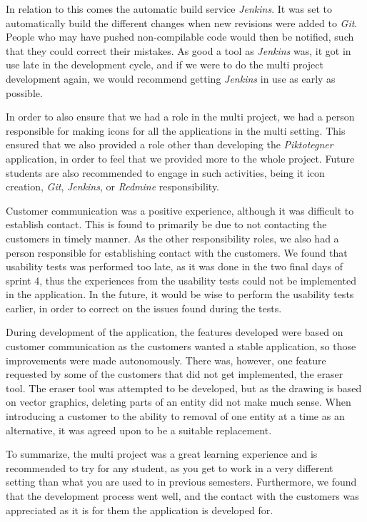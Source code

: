 In relation to this comes the automatic build service \textit{Jenkins}. 
It was set to automatically build the different changes when new revisions were added to \textit{Git}. 
People who may have pushed non-compilable code would then be notified, such that they could correct their mistakes.
As good a tool as \textit{Jenkins} was, it got in use late in the development cycle, and if we were to do the multi project development again, we would recommend getting \textit{Jenkins} in use as early as possible.

In order to also ensure that we had a role in the multi project, we had a person responsible for making icons for all the applications in the multi setting.
This ensured that we also provided a role other than developing the \textit{Piktotegner} application, in order to feel that we provided more to the whole project. 
Future students are also recommended to engage in such activities, being it icon creation, \textit{Git}, \textit{Jenkins}, or \textit{Redmine} responsibility.

Customer communication was a positive experience, although it was difficult to establish contact.
This is found to primarily be due to not contacting the customers in timely manner.
As the other responsibility roles, we also had a person responsible for establishing contact with the customers.
We found that usability tests was performed too late, as it was done in the two final days of sprint 4, thus the experiences from the usability tests could not be implemented in the application.
In the future, it would be wise to perform the usability tests earlier, in order to correct on the issues found during the tests.

During development of the application, the features developed were based on customer communication as the customers wanted a stable application, so those improvements were made autonomously.
There was, however, one feature requested by some of the customers that did not get implemented, the eraser tool.
The eraser tool was attempted to be developed, but as the drawing is based on vector graphics, deleting parts of an entity did not make much sense. 
When introducing a customer to the ability to removal of one entity at a time as an alternative, it was agreed upon to be a suitable replacement.

To summarize, the multi project was a great learning experience and is recommended to try for any student, as you get to work in a very different setting than what you are used to in previous semesters. 
Furthermore, we found that the development process went well, and the contact with the customers was appreciated as it is for them the application is developed for.


% 

